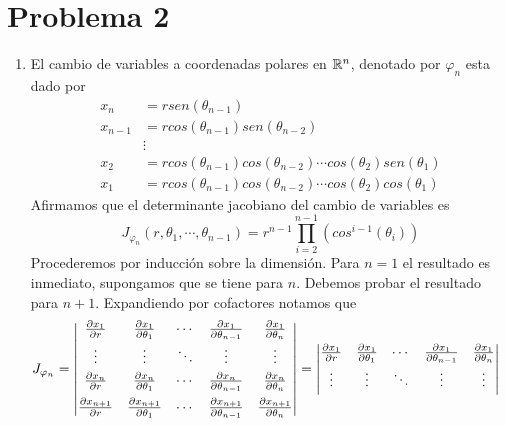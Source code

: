 \documentclass{article}
\begin{document}
\section*{Problema 2}
\begin{enumerate}
    \item El cambio de variables a coordenadas polares en $\mathbb{R}^{n}$, denotado por $\varphi_{n}$ 
    esta dado por
    \begin{align*}
        x_{n} &= rsen(\theta_{n-1}) \\
        x_{n-1} &= rcos(\theta_{n-1})sen(\theta_{n-2}) \\
        &\vdots \\
        x_{2} &= rcos(\theta_{n-1})cos(\theta_{n-2})\cdots cos(\theta_{2})sen(\theta_{1}) \\
        x_{1} &= rcos(\theta_{n-1})cos(\theta_{n-2})\cdots cos(\theta_{2})cos(\theta_{1})
    \end{align*}
    Afirmamos que el determinante jacobiano del cambio de variables es
    \begin{equation*}
        J_{\varphi_{n}}(r,\theta_{1},\cdots,\theta_{n-1})=r^{n-1}
        \prod_{i=2}^{n-1}(cos^{i-1}(\theta_{i}))
    \end{equation*}
    Procederemos por inducción sobre la dimensión. Para $n=1$ el resultado es inmediato, 
    supongamos que se tiene para $n$. Debemos probar el resultado para $n+1$. Expandiendo por
    cofactores notamos que
    \begin{align*}
        J_{\varphi_{n}} &= \begin{vmatrix}
            \frac{\partial x_{1}}{\partial r} & \frac{\partial x_{1}}{\partial\theta_{1}} & \cdots & \frac{\partial x_{1}}{\partial\theta_{n-1}} & 
            \frac{\partial x_{1}}{\partial\theta_{n}} \\[1mm]
            \vdots & \vdots & \ddots & \vdots & \vdots \\[1mm]
            \frac{\partial x_{n}}{\partial r} & \frac{\partial x_{n}}{\partial\theta_{1}} & \cdots & \frac{\partial x_{n}}{\partial\theta_{n-1}} & 
            \frac{\partial x_{n}}{\partial\theta_{n}} \\[2mm]
            \frac{\partial x_{n+1}}{\partial r} & \frac{\partial x_{n+1}}{\partial\theta_{1}} & \cdots & \frac{\partial x_{n+1}}{\partial\theta_{n-1}} & 
            \frac{\partial x_{n+1}}{\partial\theta_{n}}
        \end{vmatrix}=
        \begin{vmatrix}
            \frac{\partial x_{1}}{\partial r} & \frac{\partial x_{1}}{\partial\theta_{1}} & \cdots & \frac{\partial x_{1}}{\partial\theta_{n-1}} & 
            \frac{\partial x_{1}}{\partial\theta_{n}} \\[1mm]
            \vdots & \vdots & \ddots & \vdots & \vdots \\[1mm]

\end{vmatrix}
\end{align*}
\end{enumerate}
\end{document}
